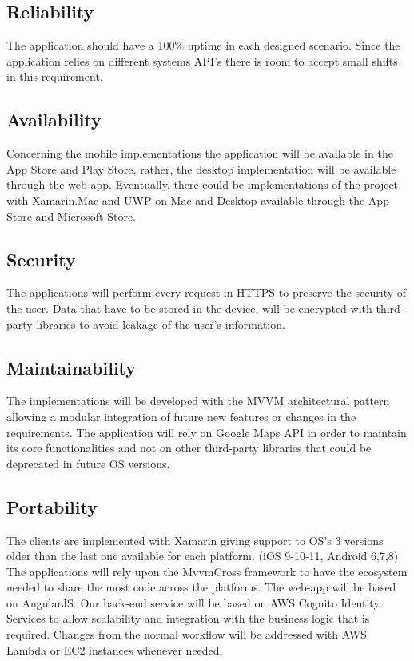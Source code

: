\subsection{Reliability}
The application should have a 100\% uptime in each designed scenario. Since the application relies on different systems API’s there is room to accept small shifts in this requirement.

\subsection{Availability}
Concerning the mobile implementations the application will be available in the App Store and Play Store, rather, the desktop implementation will be available through the web app.
Eventually, there could be implementations of the project with Xamarin.Mac and UWP on Mac and Desktop available through the App Store and Microsoft Store.

\subsection{Security}
The applications will perform every request in HTTPS to preserve the security of the user. 
Data that have to be stored in the device, will be encrypted with third-party libraries to avoid leakage of the user’s information.

\subsection{Maintainability}
The implementations will be developed with the MVVM architectural pattern allowing a modular integration of future new features or changes in the requirements. 
The application will rely on Google Maps API in order to maintain its core functionalities and not on other third-party libraries that could be deprecated in future OS versions.

\subsection{Portability}
The clients are implemented with Xamarin giving support to OS’s 3 versions older than the last one available for each platform. (iOS 9-10-11, Android 6,7,8)
The applications will rely upon the MvvmCross framework to have the ecosystem needed to share the most code across the platforms.
The web-app will be based on AngularJS.
Our back-end service will be based on AWS Cognito Identity Services to allow scalability and integration with the business logic that is required. 
Changes from the normal workflow will be addressed with AWS Lambda or EC2 instances whenever needed.